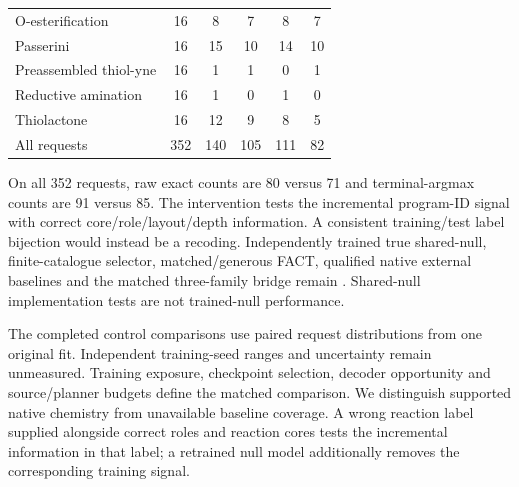\begin{table}[H]
\begin{tabular}{@{}>{\raggedright\arraybackslash}p{}ccccc@{}}
O-esterification & 16 & 8 & 7 & 8 & 7 \\
Passerini & 16 & 15 & 10 & 14 & 10 \\
Preassembled thiol-yne & 16 & 1 & 1 & 0 & 1 \\
Reductive amination & 16 & 1 & 0 & 1 & 0 \\
Thiolactone & 16 & 12 & 9 & 8 & 5 \\
\midrule
All requests & 352 & 140 & 105 & 111 & 82 \\
\bottomrule
\end{tabular}
\par\smallskip\raggedright\scriptsize
On all 352 requests, raw exact counts are 80 versus 71 and terminal-argmax counts are 91 versus 85. The intervention tests the incremental program-ID signal with correct core/role/layout/depth information. A consistent training/test label bijection would instead be a recoding. Independently trained true shared-null, finite-catalogue selector, matched/generous FACT, qualified native external baselines and the matched three-family bridge remain \PendingCell. Shared-null implementation tests are not trained-null performance.
\end{table}
The completed control comparisons use paired request distributions from one original fit. Independent training-seed ranges and uncertainty remain unmeasured. Training exposure, checkpoint selection, decoder opportunity
and source/planner budgets define the matched comparison. We distinguish supported native chemistry
from unavailable baseline coverage. A wrong reaction label supplied alongside correct roles and
reaction cores tests the incremental information in that label; a retrained null model additionally
removes the corresponding training signal.


